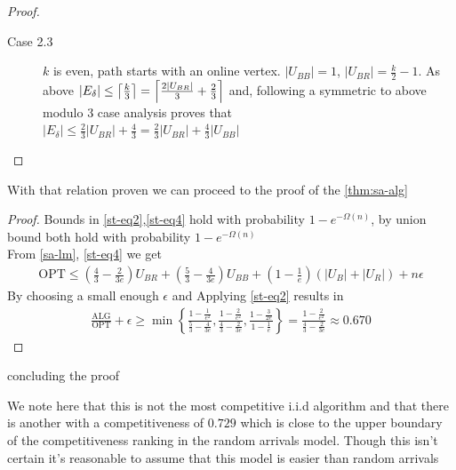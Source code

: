 \begin{proof}
\begin{description}
\begin{description}
			\item[Case 2.3] $k$ is even, path starts with an online vertex. $|U_{BB}|=1$, $|U_{BR}|=\frac{k}{2}-1$. As above $|E_\delta|\leq\left\lceil \frac{k}{3} \right\rceil=\left\lceil \frac{2|U_{BR}|}{3}+\frac{2}{3} \right\rceil$ and, following a symmetric to above modulo $3$ case analysis proves that\\ $|E_\delta|\leq\frac{2}{3}|U_{BR}|+\frac{4}{3}=\frac{2}{3}|U_{BR}|+\frac{4}{3}|U_{BB}|$
		\end{description}  
	\end{description}
\end{proof}

With that relation proven we can proceed to the proof of the \autoref{thm:sa-alg}

\begin{proof}
	Bounds in \autoref{st-eq2},\autoref{st-eq4} hold with probability $1-e^{-\Omega(n)}$, by union bound both hold with probability $1-e^{-\Omega(n)}$\\
	From \autoref{sa-lm}, \autoref{st-eq4} we get
	\begin{align*}
		\mathrm{OPT}\leq\left(\frac{4}{3}-\frac{2}{3e}\right)U_{BR}+\left(\frac{5}{3}-\frac{4}{3e}\right)U_{BB}+\left(1-\frac{1}{e}\right)\left(|U_B|+|U_R|\right)+n \epsilon
	\end{align*}
	By choosing a small enough $\epsilon$ and Applying \autoref{st-eq2} results in
	\begin{align*}
		\frac{\mathrm{ALG}}{\mathrm{OPT}}+\epsilon\geq\min\left\{\frac{1-\frac{1}{e^2}}{\frac{5}{3}-\frac{4}{3e}},\frac{1-\frac{2}{e^2}}{\frac{4}{3}-\frac{2}{3e}},\frac{1-\frac{3}{2e}}{1-\frac{1}{e}}\right\}=\frac{1-\frac{2}{e^2}}{\frac{4}{3}-\frac{2}{3e}}\approx0.670
	\end{align*}
\end{proof}

concluding the proof

We note here that this is not the most competitive i.i.d algorithm and that there is another with a competitiveness of $0.729$ which is close to the upper boundary of the competitiveness ranking in the random arrivals model. Though this isn't certain it's reasonable to assume that this model is easier than random arrivals